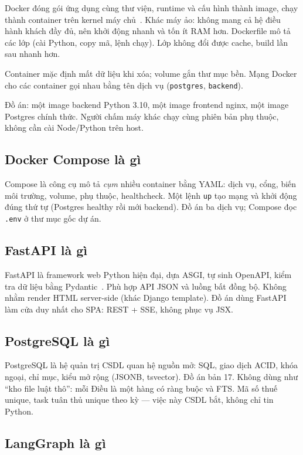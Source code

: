 Docker đóng gói ứng dụng cùng thư viện, runtime và cấu hình thành image, chạy
thành container trên kernel máy chủ~\cite{docker}. Khác máy ảo: không mang cả
hệ điều hành khách đầy đủ, nên khởi động nhanh và tốn ít RAM hơn. Dockerfile
mô tả các lớp (cài Python, copy mã, lệnh chạy). Lớp không đổi được cache, build
lần sau nhanh hơn.

Container mặc định mất dữ liệu khi xóa; volume gắn thư mục bền. Mạng Docker cho
các container gọi nhau bằng tên dịch vụ (\texttt{postgres}, \texttt{backend}).

Đồ án: một image backend Python 3.10, một image frontend nginx, một image
Postgres chính thức. Người chấm máy khác chạy cùng phiên bản phụ thuộc, không
cần cài Node/Python trên host.

\subsection{Docker Compose là gì}

Compose là công cụ mô tả \emph{cụm} nhiều container bằng YAML: dịch vụ, cổng,
biến môi trường, volume, phụ thuộc, healthcheck. Một lệnh \texttt{up} tạo mạng
và khởi động đúng thứ tự (Postgres healthy rồi mới backend). Đồ án ba dịch vụ;
Compose đọc \texttt{.env} ở thư mục gốc dự án.

\subsection{FastAPI là gì}

FastAPI là framework web Python hiện đại, dựa ASGI, tự sinh OpenAPI, kiểm tra
dữ liệu bằng Pydantic~\cite{fastapi}. Phù hợp API JSON và luồng bất đồng bộ.
Không nhằm render HTML server-side (khác Django template). Đồ án dùng FastAPI
làm cửa duy nhất cho SPA: REST + SSE, không phục vụ JSX.

\subsection{PostgreSQL là gì}

PostgreSQL là hệ quản trị CSDL quan hệ nguồn mở: SQL, giao dịch ACID, khóa
ngoại, chỉ mục, kiểu mở rộng (JSONB, tsvector). Đồ án bản 17. Không dùng như
``kho file luật thô'': mỗi Điều là một hàng có ràng buộc và FTS. Mã số thuế
unique, task tuân thủ unique theo kỳ --- việc này CSDL bắt, không chỉ tin Python.

\subsection{LangGraph là gì}

